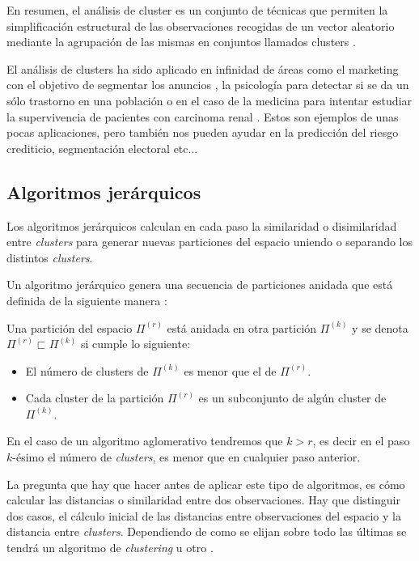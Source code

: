 \noindent En resumen, el análisis de cluster es un conjunto de técnicas que permiten la simplificación estructural de las observaciones recogidas de un vector aleatorio mediante la agrupación de las mismas en conjuntos llamados clusters \cite{Everitt 2011}. 

\noindent El análisis de clusters ha sido aplicado en infinidad de áreas como el marketing con el objetivo de segmentar los anuncios \cite{Okazaki 2006}, la psicología para detectar si se da un sólo trastorno en una población \cite{Everitt 2002} o en el caso de la medicina para intentar estudiar la supervivencia de pacientes con carcinoma renal \cite{Witten 2010}. Estos son ejemplos de unas pocas aplicaciones, pero también nos pueden ayudar en la predicción del riesgo crediticio, segmentación electoral etc... 

\subsection{Algoritmos jerárquicos}

\noindent Los algoritmos jerárquicos calculan en cada paso la similaridad o disimilaridad entre \emph{clusters} para generar nuevas particiones del espacio uniendo o separando los distintos \emph{clusters}.

\noindent Un algoritmo jerárquico genera una secuencia de particiones anidada que está definida de la siguiente manera \cite{Scitovski 2021} :
\begin{defi}
Una partición del espacio $\Pi^{(r)}$ está anidada en otra partición $\Pi^{(k)}$ y se denota $\Pi^{(r)} \sqsubset \Pi^{(k)}$ si cumple lo siguiente:
\begin{itemize}
\item El número de clusters de $\Pi^{(k)}$ es menor que el de $\Pi^{(r)}$. 
\item Cada cluster de la partición $\Pi^{(r)}$ es un subconjunto de algún cluster de $\Pi^{(k)}$. 
\end{itemize}
En el caso de un algoritmo aglomerativo tendremos que $k>r$, es decir en el paso $k$-ésimo el número de \emph{clusters}, es menor que en cualquier paso anterior.

\end{defi}

\noindent La pregunta que hay que hacer antes de aplicar este tipo de algoritmos, es cómo calcular las distancias o similaridad entre dos observaciones. Hay que distinguir dos casos, el cálculo inicial de las distancias entre observaciones del espacio y la distancia entre \emph{clusters}. Dependiendo de como se elijan sobre todo las últimas se tendrá un algoritmo de \emph{clustering} u otro \cite{Peña 2002}. 

